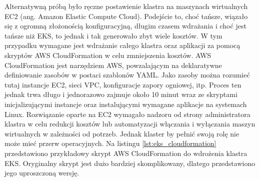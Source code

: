 Alternatywną próbą było ręczne postawienie klastra na maszynach wirtualnych EC2 (ang. Amazon Elastic Compute Cloud). Podejście to, choć tańsze, wiązało się z ogromną złożonością konfiguracyjną, długim czasem wdrażania i choć jest tańsze niż EKS, to jednak i tak generowało zbyt wiele kosztów. W tym przypadku wymagane jest wdrażanie całego klastra oraz aplikacji za pomocą skryptów AWS CloudFormation w celu zmniejszenia kosztów. AWS CloudFormation jest narzędziem AWS, powzalającym na deklaratywne definiowanie zasobów w postaci szablonów YAML. Jako zasoby można rozumieć tutaj instancje EC2, sieci VPC, konfiguracje zapory ogniowej, itp. Proces ten jednak trwa długo i jednorazowo zajmuje około 10 minut wraz ze skryptami inicjalizującymi instancje oraz instalującymi wymagane aplikacje na systemach Linux. Rozwiązanie oparte na EC2 wymagało nadzoru od strony administratora klastra w celu redukcji kosztów lub automatyzacji włączania i wyłączania maszyn wirtualnych w zależności od potrzeb. Jednak klaster by pełnić swoją rolę nie może mieć przerw operacyjnych. Na listingu \ref{lst:eks_cloudformation} przedstawiono przykładowy skrypt AWS CloudFormation do wdrożenia klastra EKS. Oryginalny skrypt jest dużo bardziej skomplikowany, dlatego przedstawiono jego uproszczoną wersję.

